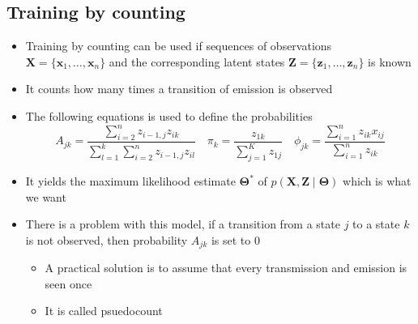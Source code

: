 \documentclass[a4, english]{article}
\begin{document}
\subsection{Training by counting}
\begin{itemize}
	\item Training by counting can be used if sequences of observations $\pmb X = \{\pmb x_1, \dots, \pmb x_n\}$ and the corresponding latent states $\pmb Z = \{\pmb z_1, \dots, \pmb z_n\}$ is known
  \item It counts how many times a transition of emission is observed 
  \item The following equations is used to define the probabilities
  \begin{equation*}
    A_{jk} = \frac{\sum_{i=2}^n z_{i-1,j}z_{ik}}{\sum_{l=1}^k\sum_{i=2}^n z_{i-1,j}z_{il}}  \quad
    \pi_k = \frac{z_{1k}}{\sum_{j=1}^Kz_{1j}} \quad
    \phi_{jk}=\frac{\sum_{i=1}^n z_{ik}x_{ij}}{\sum_{i=1}^n z_{ik}} 
  \end{equation*}
  \item It yields the maximum likelihood estimate $\pmb \Theta^*$ of $p(\pmb X, \pmb Z \mid \pmb \Theta)$ which is what we want
  \item There is a problem with this model, if a transition from a state $j$ to a state $k$ is not observed, then probability $A_{jk}$ is set to $0$  
  \begin{itemize}
  	\item A practical solution is to assume that every transmission and emission is seen once   
    \item It is called psuedocount
  \end{itemize}
\end{itemize} 
\end{document}
